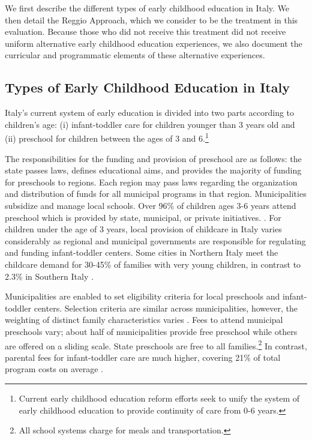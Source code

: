 We first describe the different types of early childhood education in Italy. We then detail the Reggio Approach, which we consider to be the treatment in this evaluation. Because those who did not receive this treatment did not receive uniform alternative early childhood education experiences, we also document the curricular and programmatic elements of these alternative experiences.

\subsection{Types of Early Childhood Education in Italy}

Italy's current system of early education is divided into two parts according to children's age: (i) infant-toddler care for children younger than 3 years old and (ii) preschool for children between the ages of 3 and 6.\footnote{Current early childhood education reform efforts seek to unify the system of early childhood education to provide continuity of care from 0-6 years.} 

The responsibilities for the funding and provision of preschool are as follows: the state passes laws, defines educational aims, and provides the majority of funding for preschools to regions. Each region may pass laws regarding the organization and distribution of funds for all municipal programs in that region. Municipalities subsidize and manage local schools. Over 96\% of children ages 3-6 years attend preschool which is provided by state, municipal, or private initiatives.  \citep{Becchi-Ferrari_1990_Pub-Inf-Centres-Italy}. For children under the age of 3 years, local provision of childcare in Italy varies considerably as regional and municipal governments are responsible for regulating and funding infant-toddler centers. Some cities in Northern Italy meet the childcare demand for 30-45\% of families with very young children, in contrast to 2.3\% in Southern Italy \citep{Musatti-Picchio_2010_IJEC}. 

Municipalities are enabled to set eligibility criteria for local preschools and infant-toddler centers. Selection criteria are similar across municipalities, however, the weighting of distinct family characteristics varies \citep{Del-Boca-etal_2016_CESifo-ES}. Fees to attend municipal preschools vary; about half of municipalities provide free preschool while others are offered on a sliding scale. State preschools are free to all families.\footnote{All school systems charge for meals and transportation.} In contrast, parental fees for infant-toddler care are much higher, covering 21\% of total program costs on average \citep{Musatti-Picchio_2010_IJEC}. 

